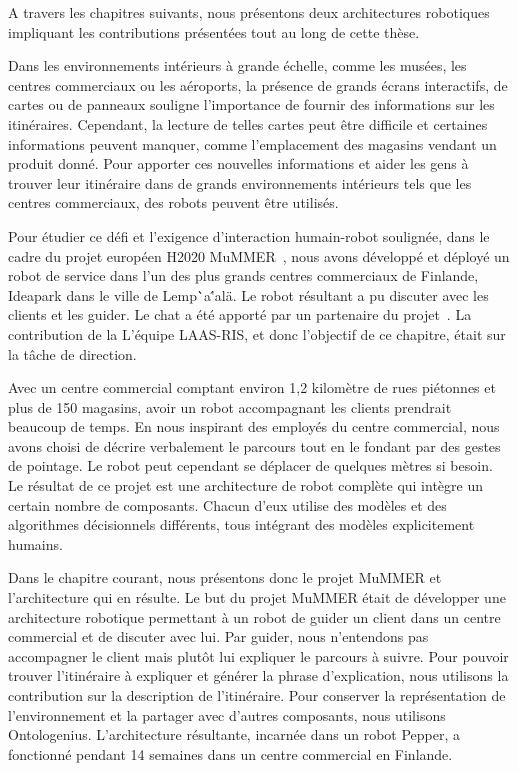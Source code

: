 A travers les chapitres suivants, nous présentons deux architectures robotiques impliquant les contributions présentées tout au long de cette thèse.

Dans les environnements intérieurs à grande échelle, comme les musées, les centres commerciaux ou les aéroports, la présence de grands écrans interactifs, de cartes ou de panneaux souligne l'importance de fournir des informations sur les itinéraires. Cependant, la lecture de telles cartes peut être difficile et certaines informations peuvent manquer, comme l'emplacement des magasins vendant un produit donné. Pour apporter ces nouvelles informations et aider les gens à trouver leur itinéraire dans de grands environnements intérieurs tels que les centres commerciaux, des robots peuvent être utilisés.

Pour étudier ce défi et l'exigence d'interaction humain-robot soulignée, dans le cadre du projet européen H2020 MuMMER~\cite{foster_2016_mummer}, nous avons développé et déployé un robot de service dans l'un des plus grands centres commerciaux de Finlande, Ideapark dans le ville de Lemp\``a\''al\"a. Le robot résultant a pu discuter avec les clients et les guider. Le chat a été apporté par un partenaire du projet~\cite{papaioannou_2018_human}. La contribution de la L'équipe LAAS-RIS, et donc l'objectif de ce chapitre, était sur la tâche de direction.

Avec un centre commercial comptant environ 1,2 kilomètre de rues piétonnes et plus de 150 magasins, avoir un robot accompagnant les clients prendrait beaucoup de temps. En nous inspirant des employés du centre commercial, nous avons choisi de décrire verbalement le parcours tout en le fondant par des gestes de pointage. Le robot peut cependant se déplacer de quelques mètres si besoin.
Le résultat de ce projet est une architecture de robot complète qui intègre un certain nombre de composants. Chacun d'eux utilise des modèles et des algorithmes décisionnels différents, tous intégrant des modèles explicitement humains. 

Dans le chapitre courant, nous présentons donc le projet MuMMER et l'architecture qui en résulte. Le but du projet MuMMER était de développer une architecture robotique permettant à un robot de guider un client dans un centre commercial et de discuter avec lui. Par guider, nous n'entendons pas accompagner le client mais plutôt lui expliquer le parcours à suivre. Pour pouvoir trouver l'itinéraire à expliquer et générer la phrase d'explication, nous utilisons la contribution sur la description de l'itinéraire. Pour conserver la représentation de l'environnement et la partager avec d'autres composants, nous utilisons Ontologenius. L'architecture résultante, incarnée dans un robot Pepper, a fonctionné pendant 14 semaines dans un centre commercial en Finlande. 

